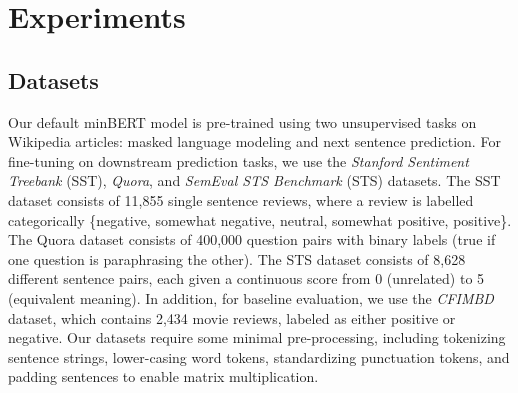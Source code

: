 \documentclass{article}
\begin{document}
\section{Experiments}
\label{sec: experiments}

\subsection{Datasets} 
Our default minBERT model is pre-trained using two unsupervised tasks on Wikipedia articles: masked language modeling and next sentence prediction. For fine-tuning on downstream prediction tasks, we use the \textit{Stanford Sentiment Treebank} (SST), \textit{Quora}, and \textit{SemEval STS Benchmark} (STS) datasets. The SST dataset consists of 11,855 single sentence reviews, where a review is labelled categorically \{negative, somewhat negative, neutral, somewhat positive, positive\}. The Quora dataset consists of 400,000 question pairs with binary labels (true if one question is paraphrasing the other). The STS dataset consists of 8,628 different sentence pairs, each given a continuous score from 0 (unrelated) to 5 (equivalent meaning). In addition, for baseline evaluation, we use the \emph{CFIMBD} dataset, which contains 2,434 movie reviews, labeled as either positive or negative. Our datasets require some minimal pre-processing, including tokenizing sentence strings, lower-casing word tokens, standardizing punctuation tokens, and padding sentences to enable matrix multiplication.
\end{document}

